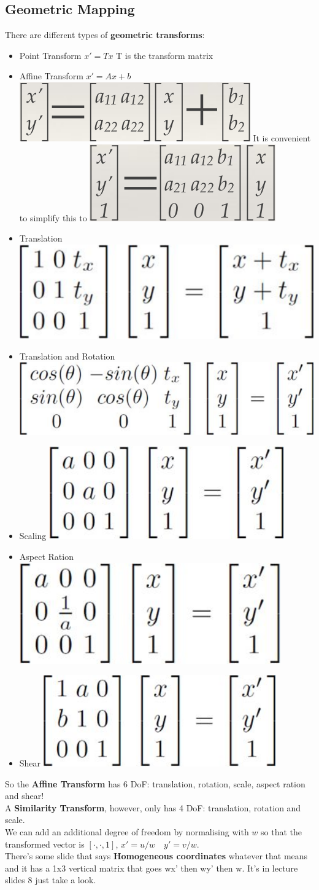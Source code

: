 \documentclass{article}
\begin{document}
	\subsection{Geometric Mapping}
	There are different types of \textbf{geometric transforms}:
	\begin{itemize}
		\item Point Transform
		\subitem $x'=Tx$
		\subitem T is the transform matrix
		\item Affine Transform
		\subitem $x'=Ax+b$
		\subitem \includegraphics[width=0.2\linewidth]{affine_A}
		\subitem It is convenient to simplify this to
		\subitem \includegraphics[width=0.2\linewidth]{affine_B}
		\item Translation
		\subitem \includegraphics[width=0.3\linewidth]{translation}
		\item Translation and Rotation
		\subitem \includegraphics[width=0.3\linewidth]{rotation}
		\item Scaling
		\subitem \includegraphics[width=0.2\linewidth]{scale}
		\item Aspect Ration
		\subitem \includegraphics[width=0.2\linewidth]{aspect}
		\item Shear
		\includegraphics[width=0.2\linewidth]{shear}
	\end{itemize}
	So the \textbf{Affine Transform }has 6 DoF: translation, rotation, scale, aspect ration and shear!\\
	A \textbf{Similarity Transform}, however, only has 4 DoF: translation, rotation and scale.\\
	We can add an additional degree of freedom by normalising with $w$ so that the transformed vector is $[\cdot,\cdot,1]$, $x'=u/w\quad y'=v/w$.\\
	There's some slide that says \textbf{Homogeneous coordinates} whatever that means and it has a 1x3 vertical matrix that goes wx' then wy' then w. It's in lecture slides 8 just take a look.
\end{document}
